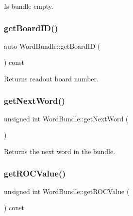 Is bundle empty. 

\mbox{\label{class_word_bundle_afa38c6a44582d1113b9d492bb72dc9ef}} 
\subsubsection{\texorpdfstring{get\+Board\+I\+D()}{getBoardID()}}
{\footnotesize\ttfamily auto Word\+Bundle\+::get\+Board\+ID (\begin{DoxyParamCaption}{ }\end{DoxyParamCaption}) const\hspace{0.3cm}{\ttfamily [inline]}}



Returns readout board number. 

\mbox{\label{class_word_bundle_a950e328fdf8b00e59b2d68da5182763f}} 
\subsubsection{\texorpdfstring{get\+Next\+Word()}{getNextWord()}}
{\footnotesize\ttfamily unsigned int Word\+Bundle\+::get\+Next\+Word (\begin{DoxyParamCaption}{ }\end{DoxyParamCaption})\hspace{0.3cm}{\ttfamily [inline]}}



Returns the next word in the bundle. 

\mbox{\label{class_word_bundle_ad2c91f230ac93d19900eba6b2c64d0e9}} 
\subsubsection{\texorpdfstring{get\+R\+O\+C\+Value()}{getROCValue()}}
{\footnotesize\ttfamily unsigned int Word\+Bundle\+::get\+R\+O\+C\+Value (\begin{DoxyParamCaption}{ }\end{DoxyParamCaption}) const\hspace{0.3cm}{\ttfamily [inline]}}



